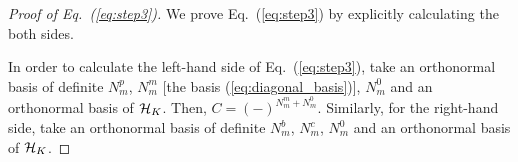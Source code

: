 \documentclass[a4paper,12pt]{article}
\newcommand{\eq}[1]{(\ref{eq:#1})}
\newcommand{\hN}{\hat{N}^g}
\begin{document}
\begin{proof}[Proof of Eq.~\eq{step3}]
We prove Eq.~\eq{step3} by explicitly calculating the both sides.

In order to calculate the left-hand side of Eq.~\eq{step3}, take an orthonormal basis of
definite $N^{p}_{m}$, $N^{m}_{m}$ [the basis 
\eq{diagonal_basis}], $N^{0}_{m}$ and an orthonormal basis of ${\cal
H}_{K} $. Then, $C=(-)^{N^{m}_{m} + N^{0}_{m}}$. Similarly, for the right-hand side, take an orthonormal basis of definite
$N^{b}_{m}$, $N^{c}_{m}$, $N^{0}_{m}$ and an orthonormal basis of ${\cal
H}_{K}$. 

%
%



\end{proof}
\end{document}
